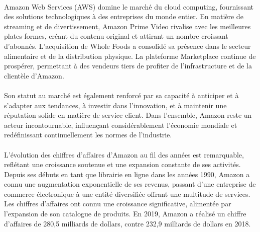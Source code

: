 \paragraph{}
\vspace{-2em}  %
Amazon Web Services (AWS) domine le marché du cloud computing, fournissant des solutions technologiques à des entreprises du monde entier. En matière de streaming et de divertissement, Amazon Prime Video rivalise avec les meilleures plates-formes, créant du contenu original et attirant un nombre croissant d'abonnés. L'acquisition de Whole Foods a consolidé sa présence dans le secteur alimentaire et de la distribution physique. La plateforme Marketplace continue de prospérer, permettant à des vendeurs tiers de profiter de l'infrastructure et de la clientèle d'Amazon. 

\paragraph{}
\vspace{-2em}  %
Son statut au marché est également renforcé par sa capacité à anticiper et à s'adapter aux tendances, à investir dans l'innovation, et à maintenir une réputation solide en matière de service client. Dans l'ensemble, Amazon reste un acteur incontournable, influençant considérablement l'économie mondiale et redéfinissant continuellement les normes de l'industrie.

\paragraph{}
\vspace{-2em}  %
L'évolution des chiffres d'affaires d'Amazon au fil des années est remarquable, reflétant une croissance soutenue et une expansion constante de ses activités. Depuis ses débuts en tant que librairie en ligne dans les années 1990, Amazon a connu une augmentation exponentielle de ses revenus, passant d'une entreprise de commerce électronique à une entité diversifiée offrant une multitude de services. Les chiffres d'affaires ont connu une croissance significative, alimentée par l'expansion de son catalogue de produits. En 2019, Amazon a réalisé un chiffre d'affaires de 280,5 milliards de dollars, contre 232,9 milliards de dollars en 2018.

